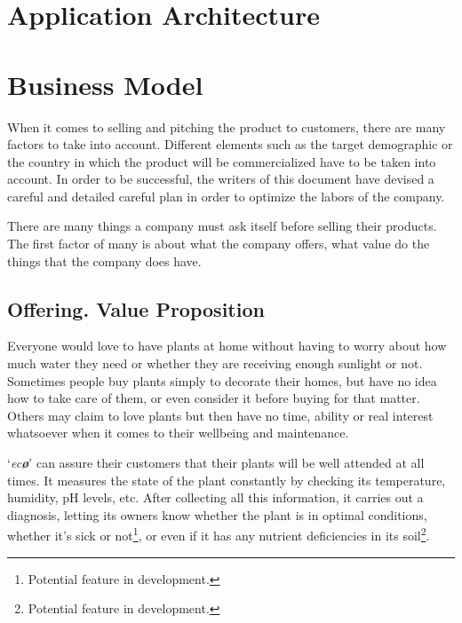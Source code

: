 \documentclass[english,runningheads,a4paper]{llncs}[2018/03/10]
\begin{document}

\section*{Application Architecture}


\section*{Business Model}

When it comes to selling and pitching the product to customers, there are many
factors to take into account. Different elements such as the target demographic
or the country in which the product will be commercialized have to be taken into
account. In order to be successful, the writers of this document have devised a
careful and detailed careful plan in order to optimize the labors of the
company.

There are many things a company must ask itself before selling their products.
The first factor of many is about what the company offers, what value do the
things that the company does have.


    \subsection*{Offering. Value Proposition}

    Everyone would love to have plants at home without having to worry about how
    much water they need or whether they are receiving enough sunlight or not.
    Sometimes people buy plants simply to decorate their homes, but have no idea
    how to take care of them, or even consider it before buying for that matter.
    Others may claim to love plants but then have no time, ability or real
    interest whatsoever when it comes to their wellbeing and maintenance.

    `\textit{ec{\textbf{\o}}}' can assure their customers that their plants will
    be well attended at all times. It measures the state of the plant constantly
    by checking its temperature, humidity, pH levels, etc. After collecting all
    this information, it carries out a diagnosis, letting its owners know
    whether the plant is in optimal conditions, whether it's sick or
    not\footnote{Potential feature in development.}, or even if it has any
    nutrient deficiencies in its soil\footnote{Potential feature in
    development.}.
\end{document}
